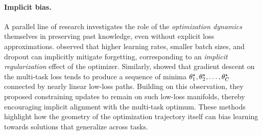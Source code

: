 \documentclass[10pt]{article} %
\begin{document}
\paragraph{Implicit bias.}
A parallel line of research investigates the role of the \emph{optimization dynamics} themselves in preserving past knowledge, even without explicit loss approximations.  
\citet{mirzadehUnderstandingRoleTraining2020} observed that higher learning rates, smaller batch sizes, and dropout can implicitly mitigate forgetting, corresponding to an \emph{implicit regularization} effect of the optimizer.  
Similarly, \citet{mirzadehLinearModeConnectivity2020} showed that gradient descent on the multi-task loss tends to produce a sequence of minima $\theta_1^\star, \theta_2^\star, \ldots, \theta_C^\star$ connected by nearly linear low-loss paths.  
Building on this observation, they proposed constraining updates to remain on such low-loss manifolds, thereby encouraging implicit alignment with the multi-task optimum.  
These methods highlight how the geometry of the optimization trajectory itself can bias learning towards solutions that generalize across tasks.
\end{document}
